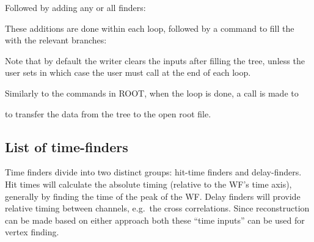 \documentclass{article}
\newcommand{\class}[1]{\code{#1}}
\begin{document}
 Followed by adding any or all finders:
 
 
 
 These additions are done within each loop, 
 followed by a command to fill the \class{TTree} with the relevant branches:
 
 
 Note that by default the writer clears the inputs after filling the tree, 
 unless the user sets  
 in which case the user must call  at the end of each loop. 
 
 Similarly to the commands in ROOT, when the loop is done, a call is made to
 
 
 to transfer the data from the tree to the open root file. 
 
 
 \subsection{List of time-finders}
 
 Time finders divide into two distinct groups: hit-time finders and delay-finders. 
 Hit times will calculate the absolute timing (relative to the WF's time axis), 
 generally by finding the time of the peak of the WF. 
 Delay finders will provide relative timing between channels, e.g.~the cross correlations. 
 Since reconstruction can be made based on either approach both these ``time inputs'' can be used for vertex finding. 
 
\end{document}
